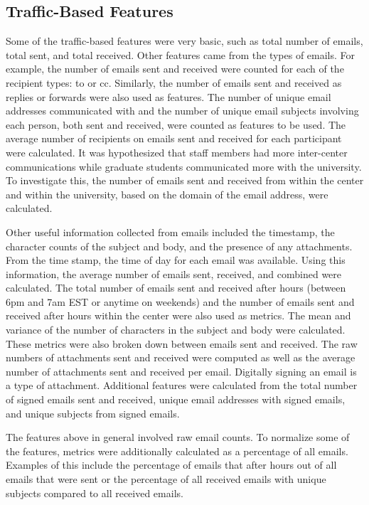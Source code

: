 \documentclass{article}
\begin{document}
\subsection{Traffic-Based Features}
Some of the traffic-based features were very basic, such as total number of emails, total sent, and total received.  Other features came from the types of emails.  For example, the number of emails sent and received were counted for each of the recipient types: to or cc.  Similarly, the number of emails sent and received as replies or forwards were also used as features.  The number of unique email addresses communicated with and the number of unique email subjects involving each person, both sent and received, were counted as features to be used.  The average number of recipients on emails sent and received for each participant were calculated.  It was hypothesized that staff members had more inter-center communications while graduate students communicated more with the university.  To investigate this, the number of emails sent and received from within the center and within the university, based on the domain of the email address, were calculated.  

Other useful information collected from emails included the timestamp, the character counts of the subject and body, and the presence of any attachments. From the time stamp, the time of day for each email was available.  Using this information, the average number of emails sent, received, and combined were calculated.  The total number of emails sent and received after hours (between 6pm and 7am EST or anytime on weekends) and the number of emails sent and received after hours within the center were also used as metrics.  The mean and variance of the number of characters in the subject and body were calculated.  These metrics were also broken down between emails sent and received.  The raw numbers of attachments sent and received were computed as well as the average number of attachments sent and received per email.  Digitally signing an email is a type of attachment.  Additional features were calculated from the total number of signed emails sent and received, unique email addresses with signed emails, and unique subjects from signed emails.

The features above in general involved raw email counts.  To normalize some of the features, metrics were additionally calculated as a percentage of all emails. Examples of this include the percentage of emails that after hours out of all emails that were sent or the percentage of all received emails with unique subjects compared to all received emails.
\end{document}
